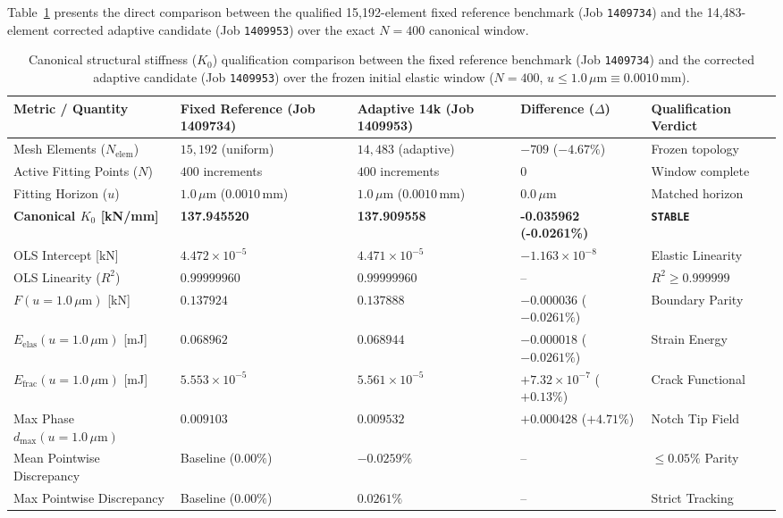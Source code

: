 Table~\ref{tab:stage14n_canonical_k0_comparison} presents the direct comparison between the qualified 15,192-element fixed reference benchmark (Job \texttt{1409734}) and the 14,483-element corrected adaptive candidate (Job \texttt{1409953}) over the exact $N=400$ canonical window.

\begin{table}[htbp]
\centering
\small
\caption{Canonical structural stiffness ($K_0$) qualification comparison between the fixed reference benchmark (Job \texttt{1409734}) and the corrected adaptive candidate (Job \texttt{1409953}) over the frozen initial elastic window ($N=400$, $u \le 1.0\,\mu\mathrm{m} \equiv 0.0010\,\mathrm{mm}$).}
\label{tab:stage14n_canonical_k0_comparison}
\begin{tabularx}{\textwidth}{lXXXl}
\toprule
\textbf{Metric / Quantity} & \textbf{Fixed Reference (Job 1409734)} & \textbf{Adaptive 14k (Job 1409953)} & \textbf{Difference ($\Delta$)} & \textbf{Qualification Verdict} \\
\midrule
Mesh Elements ($N_{\mathrm{elem}}$) & $15,192$ (uniform) & $14,483$ (adaptive) & $-709$ ($-4.67\%$) & Frozen topology \\
Active Fitting Points ($N$) & $400$ increments & $400$ increments & $0$ & Window complete \\
Fitting Horizon ($u$) & $1.0\,\mu\mathrm{m}$ ($0.0010\,\mathrm{mm}$) & $1.0\,\mu\mathrm{m}$ ($0.0010\,\mathrm{mm}$) & $0.0\,\mu\mathrm{m}$ & Matched horizon \\
\midrule
\textbf{Canonical $K_0$ [kN/mm]} & \textbf{137.945520} & \textbf{137.909558} & \textbf{-0.035962 (-0.0261\%)} & \textbf{\texttt{STABLE}} \\
OLS Intercept [kN] & $4.472\times 10^{-5}$ & $4.471\times 10^{-5}$ & $-1.163\times 10^{-8}$ & Elastic Linearity \\
OLS Linearity ($R^2$) & $0.99999960$ & $0.99999960$ & -- & $R^2 \ge 0.999999$ \\
\midrule
$F(u = 1.0\,\mu\mathrm{m})$ [kN] & $0.137924$ & $0.137888$ & $-0.000036$ ($-0.0261\%$) & Boundary Parity \\
$E_{\mathrm{elas}}(u = 1.0\,\mu\mathrm{m})$ [mJ] & $0.068962$ & $0.068944$ & $-0.000018$ ($-0.0261\%$) & Strain Energy \\
$E_{\mathrm{frac}}(u = 1.0\,\mu\mathrm{m})$ [mJ] & $5.553\times 10^{-5}$ & $5.561\times 10^{-5}$ & $+7.32\times 10^{-7}$ ($+0.13\%$) & Crack Functional \\
Max Phase $d_{\max}(u = 1.0\,\mu\mathrm{m})$ & $0.009103$ & $0.009532$ & $+0.000428$ ($+4.71\%$) & Notch Tip Field \\
Mean Pointwise Discrepancy & Baseline ($0.00\%$) & $-0.0259\%$ & -- & $\le 0.05\%$ Parity \\
Max Pointwise Discrepancy & Baseline ($0.00\%$) & $0.0261\%$ & -- & Strict Tracking \\
\bottomrule
\end{tabularx}
\end{table}

